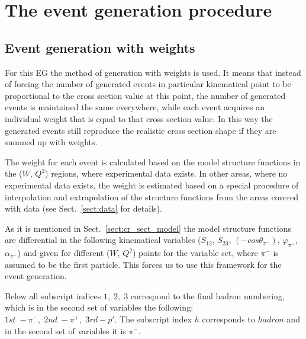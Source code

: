\chapter{The event generation procedure}
\label{sect:gen_proc}
\section{Event generation with weights}
\label{sect:gen_with_weights}



For this EG the method of generation with weights is used. It means that instead of forcing the number of generated events in particular kinematical point to be proportional to the cross section value at this point, the number of generated events is maintained the same everywhere, while each event acquires an individual weight that is equal to that cross section value. In this way the generated events still reproduce the realistic cross section shape if they are summed up with weights.

The weight for each event is calculated based on the model structure functions in the ($W$, $Q^2$) regions, where experimental data exists. In other areas, where no experimental data exists, the weight is estimated based on a special procedure of interpolation and extrapolation of the structure functions from the areas covered with data (see Sect.~\ref{sect:data} for details). 


As it is mentioned in Sect.~\ref{sect:cr_sect_model} the model structure functions are differential in the following kinematical variables ($S_{12}$, $S_{23}$, $(-cos\theta_{\pi^{-}})$, $\varphi_{\pi^{-}}$, $\alpha_{\pi^{-}}$) and given for different ($W$, $Q^2$) points for the variable set, where $\pi^{-}$ is assumed to be the first particle. This forces us to use this framework for the event generation. 

Below all subscript indices $1,\;2,\;3$ correspond to the final hadron numbering, which is in the second set of variables the following: $1st\; - \pi^{-},\; 2nd \; - \pi^{+},\;3rd - p'$. The subscript index $h$ corresponds to $hadron$ and in the second set of variables it is $\pi^{-}$.


